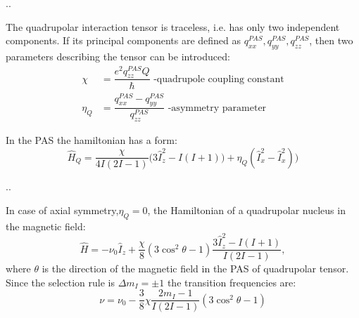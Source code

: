 \documentclass{beamer}
\begin{document}
\begin{frame}{\thesection.\thesubsection. \insertsubsection}
	
	The quadrupolar interaction tensor is traceless, i.e. has only two independent components. If its principal components are defined as $q_{xx}^{PAS}, q_{yy}^{PAS}, q_{zz}^{PAS}$, then two parameters describing the tensor can be introduced:
	\begin{align}
	   \chi &= \dfrac{e^2 q_{zz}^{PAS} Q}{\hbar}  \text{   -quadrupole coupling constant} \\
	   \eta_Q &= \dfrac{q_{xx}^{PAS} - q_{yy}^{PAS}}{q_{zz}^{PAS}} \text{  -asymmetry parameter}
	\end{align}
	
	In the PAS the hamiltonian has a form:
	\begin{equation}
		\hat{H}_Q = \dfrac{\chi }{4 I (2I-1)}\Big(3 \hat{I}_z^2 - I(I+1) ) + \eta_Q(\hat{I}_x^2 -\hat{I}_x^2)  \Big)
	\end{equation}

\end{frame}	
\begin{frame}{\thesection.\thesubsection. \insertsubsection}


	In case of axial symmetry,$\eta_Q = 0$, the Hamiltonian of a quadrupolar nucleus in the magnetic field:
	\begin{equation}
	   \hat{H} = - \nu_0 \hat{I}_z + \dfrac{\chi}{8} (3 \cos^2 \theta - 1) \dfrac{3 \hat{I}_z^2  -I(I+1) }{I(2I-1)},
	\end{equation}
	where $\theta$ is the direction of the magnetic field in the PAS of quadrupolar tensor. Since the selection rule is $\Delta m_I = \pm1$ the transition frequencies are:
	\begin{equation}
	  \nu = \nu_0 -\dfrac{3}{8} \chi \dfrac{2 m_I -1}{I(2I -1)}(3 \cos^2 \theta - 1)
	\end{equation}
	 
\end{frame}
\end{document}
